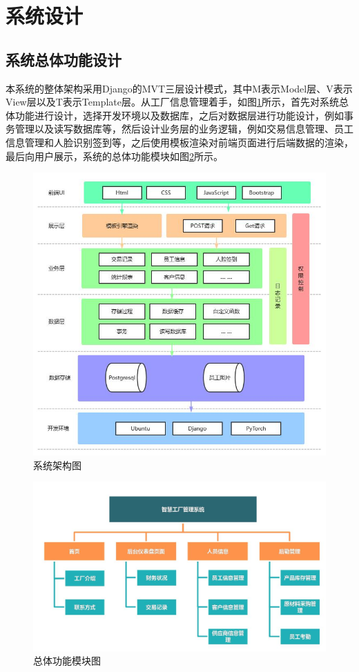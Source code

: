 \section{系统设计}

\subsection{系统总体功能设计}

本系统的整体架构采用Django的MVT三层设计模式，其中M表示Model层、V表示View层以及T表示Template层。从工厂信息管理着手，如图\ref{fig:sysarc}所示，首先对系统总体功能进行设计，选择开发环境以及数据库，之后对数据层进行功能设计，例如事务管理以及读写数据库等，然后设计业务层的业务逻辑，例如交易信息管理、员工信息管理和人脸识别签到等，之后使用模板渲染对前端页面进行后端数据的渲染，最后向用户展示，系统的总体功能模块如图\ref{fig:funmod}所示。

\begin{figure}[H]
    \centering
    \includegraphics[width=.65\textwidth]{figures/4total.jpg}
    \caption{系统架构图}
    \label{fig:sysarc}
\end{figure}

\begin{figure}[H]
    \centering
    \includegraphics[width=.65\textwidth]{figures/4funmod.jpg}
    \caption{总体功能模块图}
    \label{fig:funmod}
\end{figure}


